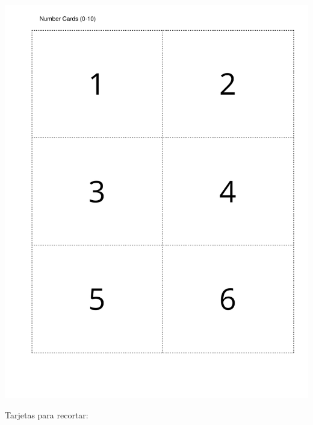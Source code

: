 \documentclass[14pt]{extarticle}
\begin{document}
\begin{image}{0}{1}{0}{}%
\includegraphics[page=2, rotate=90, scale=0.55, trim=40 40 20 40, clip, center] {external/blm/pdf-source/tarjetasDeDigitos.pdf}
\end{image}%
Tarjetas para recortar:
\end{document}
